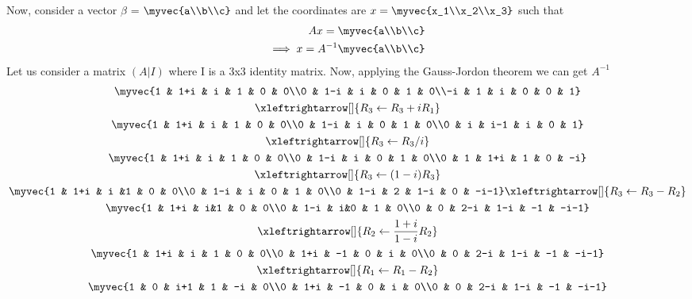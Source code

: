 \documentclass[journal,12pt,twocolumn]{IEEEtran}
\begin{document}
Now, consider a vector $\beta$ = $\myvec{a\\b\\c}$ and let the coordinates are $x=\myvec{x_1\\x_2\\x_3}$ such that
\begin{align}
Ax = \myvec{a\\b\\c}\\
\implies x = A^{-1} \myvec{a\\b\\c}
\end{align}
Let us consider a matrix $(A | I)$ where I is a 3x3 identity matrix.
Now, applying the Gauss-Jordon theorem we can get $A^{-1}$
\begin{multline}
\myvec{1 & 1+i & i & 1 & 0 & 0\\0 & 1-i & i & 0 & 1 & 0\\-i & 1 & i & 0 & 0 & 1}\\\xleftrightarrow[]{R_3\leftarrow R_3+iR_1}\\
\myvec{1 & 1+i & i & 1 & 0 & 0\\0 & 1-i & i & 0 & 1 & 0\\0 & i & i-1 & i & 0 & 1}\\
\xleftrightarrow[]{R_3\leftarrow R_3/i}\\
\myvec{1 & 1+i & i & 1 & 0 & 0\\0 & 1-i & i & 0 & 1 & 0\\0 & 1 & 1+i & 1 & 0 & -i}\\
\xleftrightarrow[]{R_3\leftarrow (1-i)R_3}\\
\myvec{1 & 1+i & i &1 & 0 & 0\\0 & 1-i & i & 0 & 1 & 0\\0 & 1-i & 2 & 1-i & 0 & -i-1}\xleftrightarrow[]{R_3\leftarrow R_3-R_2}\\
\myvec{1 & 1+i & i&1 & 0 & 0\\0 & 1-i & i&0 & 1 & 0\\0 & 0 & 2-i & 1-i & -1 & -i-1}\\
\xleftrightarrow[]{R_2\leftarrow \frac{1+i}{1-i}R_2}\\
\myvec{1 & 1+i & i & 1 & 0 & 0\\0 & 1+i & -1 & 0 & i & 0\\0 & 0 & 2-i & 1-i & -1 & -i-1}\\
\xleftrightarrow[]{R_1\leftarrow R_1-R_2}\\
\myvec{1 & 0 & i+1 & 1 & -i & 0\\0 & 1+i & -1 & 0 & i & 0\\0 & 0 & 2-i & 1-i & -1 & -i-1}\\

\end{multline}
\end{document}
